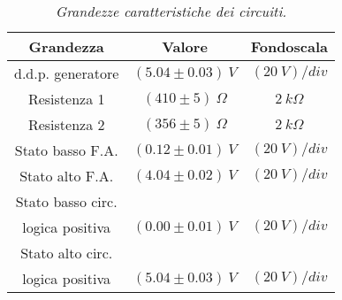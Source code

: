 \begin{table}[H]
  \centering
  \begin{tabular}[t]{c | c  c }
    \hline
    Grandezza & Valore & Fondoscala \\
    \hline
    d.d.p. generatore & $(5.04 \pm 0.03) \: V$ & $(20 \: V)/div$ \\
    Resistenza 1 & $(410 \pm 5) \: \Omega$ & $2 \: k\Omega$ \\
    Resistenza 2 & $(356 \pm 5) \: \Omega$ & $2 \: k\Omega$ \\
    Stato basso F.A. & $(0.12 \pm 0.01) \: V$ & $(20 \: V)/div$ \\
    Stato alto F.A. & $(4.04 \pm 0.02) \: V$ & $(20 \: V)/div$ \\
    Stato basso circ.\\ logica positiva & $(0.00 \pm 0.01) \: V$ & $(20 \: V)/div$ \\
    Stato alto circ.\\ logica positiva & $(5.04 \pm 0.03) \: V$ & $(20 \: V)/div$ \\
    \hline
  \end{tabular}
  \caption{\emph{Grandezze caratteristiche dei circuiti.}}
  \label{tab:livelli-logici}
\end{table}
